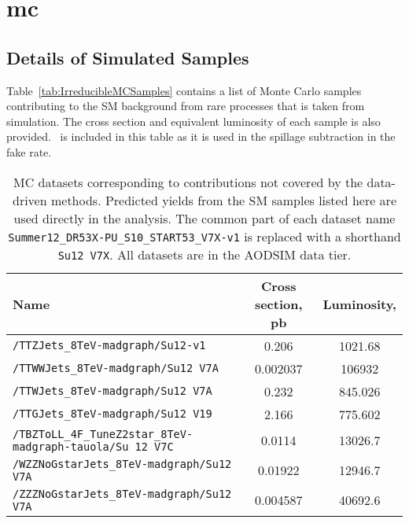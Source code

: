 \chapter{mc}

\section{Details of Simulated Samples}
\label{sec:mc_details}

Table~\ref{tab:IrreducibleMCSamples} contains a list of Monte Carlo samples contributing to the SM background from rare processes that is taken from simulation.  The cross section and equivalent luminosity of each sample is also provided. \ttZ \ is included in this table as it is used in the spillage subtraction in the fake rate.

\begin{sidewaystable}[H]
\begin{center}
\begin{tabular}{lcc}
\hline\hline
Name														           & Cross section, pb & Luminosity, \fbinv \\ \hline
\verb=/TTZJets_8TeV-madgraph/Su12-v1=                                                                 & 0.206                     &       1021.68         \\ 
\verb=/TTWWJets_8TeV-madgraph/Su12 V7A=                                                            & 0.002037          &      106932       \\ 
\verb=/TTWJets_8TeV-madgraph/Su12 V7A=                                                               & 0.232             &        845.026         \\ 
\verb=/TTGJets_8TeV-madgraph/Su12 V19=                                                                & 2.166             &       775.602          \\ 
\verb=/TBZToLL_4F_TuneZ2star_8TeV-madgraph-tauola/Su 12 V7C=                 &  0.0114             &         13026.7        \\
\verb=/WZZNoGstarJets_8TeV-madgraph/Su12 V7A=                                               & 0.01922           &       12946.7        \\ 
\verb=/ZZZNoGstarJets_8TeV-madgraph/Su12 V7A=                                                 & 0.004587          &     40692.6          \\ 
\hline\hline
\end{tabular}
\caption{\label{tab:App:IrreducibleMCSamples} MC datasets corresponding to contributions not covered by the data-driven methods.
Predicted yields from the SM samples listed here are used directly in the analysis. 
The common part of each dataset name {\tt Summer12\_DR53X-PU\_S10\_START53\_V7X-v1} is replaced with a shorthand {\tt Su12 V7X}. 
All datasets are in the AODSIM data tier.}
\end{center}
\end{sidewaystable}

